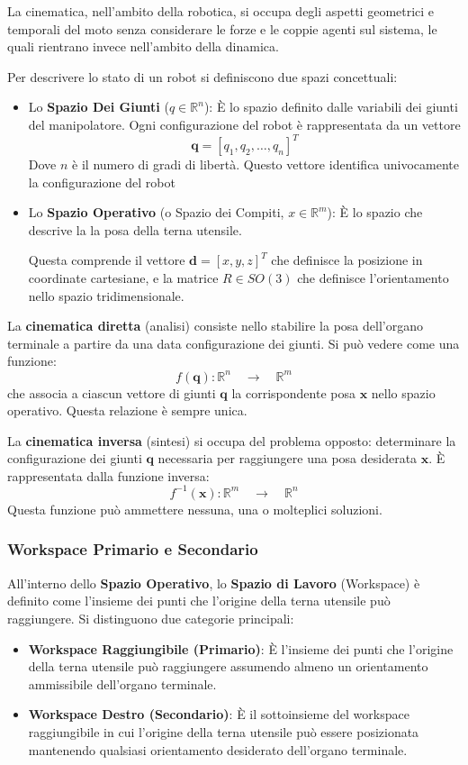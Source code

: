 ﻿\documentclass[11pt, a4paper]{article}
\begin{document}
\newpage
La cinematica, nell'ambito della robotica, si occupa degli aspetti geometrici e temporali del moto senza considerare le forze e le coppie agenti sul sistema, le quali rientrano invece nell'ambito della dinamica.

Per descrivere lo stato di un robot si definiscono due spazi concettuali:
\begin{itemize}
    \item Lo \textbf{Spazio Dei Giunti} ($q \in \mathbb{R}^{n}$): È lo spazio definito dalle variabili dei giunti del manipolatore. Ogni configurazione del robot è rappresentata da un vettore
    \[
        \bm{q} = [q_1, q_2, \dots, q_n]^T
    \]
    Dove \(n\) è il numero di gradi di libertà. Questo vettore identifica univocamente la configurazione del robot
    \item Lo \textbf{Spazio Operativo} (o Spazio dei Compiti, $x \in \mathbb{R}^{m}$): È lo spazio che descrive la la posa della terna utensile.

    Questa comprende il vettore \(\mathbf{d} = [x, y, z]^T\) che definisce la posizione in coordinate cartesiane, e la matrice \(R \in SO(3)\) che definisce l'orientamento nello spazio tridimensionale.
\end{itemize}
La \textbf{cinematica diretta} (analisi) consiste nello stabilire la posa dell'organo terminale a partire da una data configurazione dei giunti. Si può vedere come una funzione:
\[
    f(\mathbf{q}) : \mathbb{R}^{n} \quad \longrightarrow \quad \mathbb{R}^{m}
\]
che associa a ciascun vettore di giunti $\mathbf{q}$ la corrispondente posa $\mathbf{x}$ nello spazio operativo. Questa relazione è sempre unica.

La \textbf{cinematica inversa} (sintesi) si occupa del problema opposto: determinare la configurazione dei giunti $\mathbf{q}$ necessaria per raggiungere una posa desiderata $\mathbf{x}$. È rappresentata dalla funzione inversa:
\[
    f^{-1}(\mathbf{x}) : \mathbb{R}^{m} \quad \longrightarrow \quad \mathbb{R}^{n}
\]
Questa funzione può ammettere nessuna, una o molteplici soluzioni.

\subsubsection*{Workspace Primario e Secondario}
All'interno dello \textbf{Spazio Operativo}, lo \textbf{Spazio di Lavoro} (Workspace) è definito come l'insieme dei punti che l'origine della terna utensile può raggiungere.
Si distinguono due categorie principali:
\begin{itemize}
    \item \textbf{Workspace Raggiungibile (Primario)}: È l'insieme dei punti che l'origine della terna utensile può raggiungere assumendo almeno un orientamento ammissibile dell'organo terminale.
    \item \textbf{Workspace Destro (Secondario)}: È il sottoinsieme del workspace raggiungibile in cui l'origine della terna utensile può essere posizionata mantenendo qualsiasi orientamento desiderato dell'organo terminale.
\end{itemize}
\end{document}
